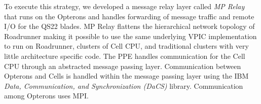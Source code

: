 \documentclass[journal,twoside]{IEEEtran}
\begin{document}





To execute this strategy, we developed a message relay layer called
\emph{MP Relay} that runs on the Opterons and handles forwarding of
message traffic and remote I/O for the QS22 blades.
MP Relay flattens the hierarchical network topology of Roadrunner
making it possible to use the same underlying VPIC implementation to
run on Roadrunner, clusters of Cell CPU, and traditional clusters with
very little architecture specific code.  The PPE handles communication
for the Cell CPU through an abstracted message passing layer.
Communication between Opterons and Cells is handled within the message
passing layer using the IBM \emph{Data, Communication, and
Synchronization (DaCS)} library.  Communication among Opterons uses
MPI.

\end{document}
